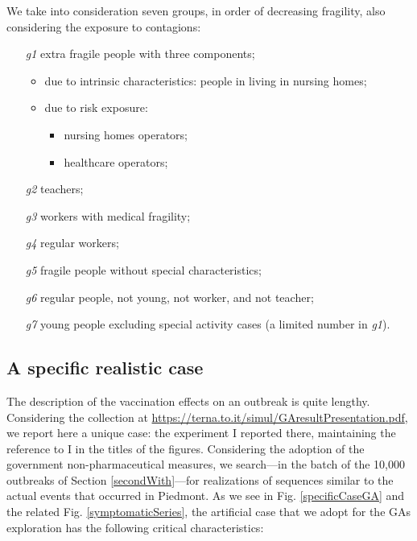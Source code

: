 \documentclass[graybox]{svmult}
\begin{document}
We take into consideration seven groups, in order of decreasing fragility, also considering the exposure to contagions:

\begin{enumerate}
\item [\emph{g1}]
	extra fragile people with three components;
	\begin{itemize}
		\item due to intrinsic characteristics: people in living in nursing homes;
		\item due to risk exposure:
		\begin{itemize}
			\item nursing homes operators;
			\item healthcare operators;
 		\end{itemize} 
 	\end{itemize} 
\item [\emph{g2}]
	teachers;
\item [\emph{g3}]
	workers with medical fragility;
\item [\emph{g4}]
	regular workers;
\item [\emph{g5}]
	fragile people without special characteristics;
\item [\emph{g6}]
	regular people, not young, not worker, and not teacher;
\item [\emph{g7}]
	young people excluding special activity cases (a limited number in \emph{g1}).
\end{enumerate}


\subsection{A specific realistic case}
\label{specific}

The description of the vaccination effects on an outbreak is quite lengthy. Considering the collection at  \href{https://terna.to.it/simul/GAresultPresentation.pdf}{https://terna.to.it/simul/GAresultPresentation.pdf}, we report here a unique case: the experiment I reported there, maintaining the reference to I in the titles of the figures.
Considering the adoption of the government non-pharmaceutical measures, we search---in the batch of the 10,000 outbreaks of Section \ref{secondWith}---for realizations of sequences similar to the actual events that occurred in Piedmont. As we see in Fig. \ref{specificCaseGA} and the related Fig. \ref{symptomaticSeries}, the artificial case that we adopt for the GAs exploration has the following critical characteristics:
\end{document}
